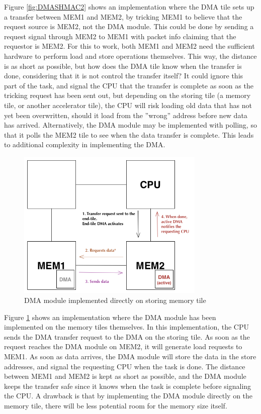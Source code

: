 Figure \ref{fig:DMASHMAC2} shows an implementation where the DMA tile sets up a transfer between MEM1 and MEM2, by tricking MEM1 to believe that the request source is MEM2, not the DMA module.
This could be done by sending a request signal through MEM2 to MEM1 with packet info claiming that the requestor is MEM2.
For this to work, both MEM1 and MEM2 need the sufficient hardware to perform load and store operations themselves.
This way, the distance is as short as possible, but how does the DMA tile know when the transfer is done, considering that it is not control the transfer itself?
It could ignore this part of the task, and signal the CPU that the transfer is complete as soon as the tricking request has been sent out, but depending on the storing tile (a memory tile, or another accelerator tile), the CPU will risk loading old data that has not yet been overwritten, should it load from the ''wrong'' address before new data has arrived.
Alternatively, the DMA module may be implemented with polling, so that it polls the MEM2 tile to see when the data transfer is complete.
This leads to additional complexity in implementing the DMA.
 
\begin{figure}[h!]
    \centering
    \includegraphics[width=0.8\textwidth]{Figures/DMA/DMASHMAC3}
    \caption{DMA module implemented directly on storing memory tile}
    \label{fig:DMASHMAC3}
\end{figure}
 
Figure \ref{fig:DMASHMAC3} shows an implementation where the DMA module has been implemented on the memory tiles themselves.
In this implementation, the CPU sends the DMA transfer request to the DMA on the storing tile.
As soon as the request reaches the DMA module on MEM2, it will generate load requests to MEM1.
As soon as data arrives, the DMA module will store the data in the store addresses, and signal the requesting CPU when the task is done.
The distance between MEM1 and MEM2 is kept as short as possible, and the DMA module keeps the transfer safe since it knows when the task is complete before signaling the CPU.
A drawback is that by implementing the DMA module directly on the memory tile, there will be less potential room for the memory size itself.

